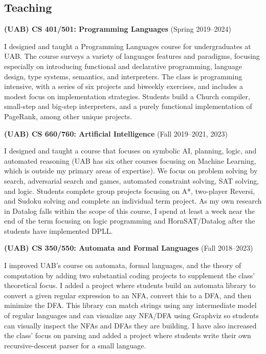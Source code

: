 \documentclass[line]{res}
\begin{document}
\begin{resume}
\section{\large Teaching} \vspace{0.2in}
    
\textbf{(UAB) CS 401/501: Programming Languages} (Spring 2019--2024)

I designed and taught a Programming Languages course for undergraduates at UAB. The course surveys a variety of languages features and paradigms, focusing especially on introducing functional and declarative programming, language design, type systems, semantics, and interpreters. The class is programming intensive, with a series of six projects and biweekly exercises, and includes a modest focus on implementation strategies. Students build a Church compiler, small-step and big-step interpreters, and a purely functional implementation of PageRank, among other unique projects.

\textbf{(UAB) CS 660/760: Artificial Intelligence} (Fall 2019--2021, 2023)

I designed and taught a course that focuses on symbolic AI, planning, logic, and automated reasoning (UAB has six other courses focusing on Machine Learning, which is outside my primary areas of expertise). We focus on problem solving by search, adversarial search and games, automated constraint solving, SAT solving, and logic. Students complete group projects focusing on A*, two-player Reversi, and Sudoku solving and complete an individual term project. As my own research in Datalog falls within the scope of this course, I spend at least a week near the end of the term focusing on logic programming and HornSAT/Datalog after the students have implemented DPLL.

\textbf{(UAB) CS 350/550: Automata and Formal Languages} (Fall 2018--2023)

I improved UAB's course on automata, formal languages, and the theory of computation by adding two substantial coding projects to supplement the class' theoretical focus. I added a project where students build an automata library to convert a given regular expression to an NFA, convert this to a DFA, and then minimize the DFA. This library can match strings using any intermediate model of regular languages and can visualize any NFA/DFA using Graphviz so students can visually inspect the NFAs and DFAs they are building. I have also increased the class' focus on parsing and added a project where students write their own recursive-descent parser for a small language.


\end{resume}
\end{document}
